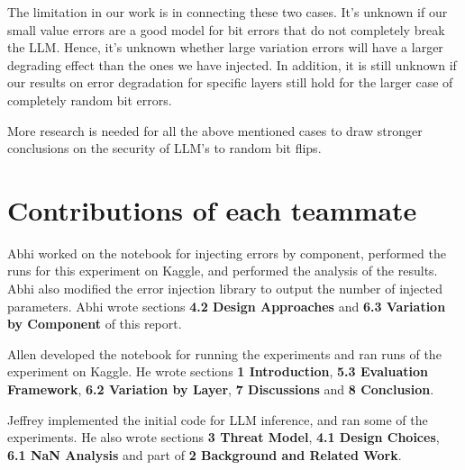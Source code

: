 The limitation in our work is in connecting these two cases. It's unknown if our small value errors are a good model for bit errors that do not completely break the LLM. Hence, it's unknown whether
large variation errors will have a larger degrading effect than the ones we have injected. In addition, it is still unknown if our results on error degradation for specific layers still hold for
the larger case of completely random bit errors.

More research is needed for all the above mentioned cases to draw stronger conclusions on the security of LLM's to random bit flips.

\section{Contributions of each teammate}
Abhi worked on the notebook for injecting errors by component, performed the runs for this experiment on Kaggle, and performed the analysis of the results. Abhi also modified the error injection library to output the number of injected parameters. Abhi wrote sections \textbf{4.2 Design Approaches} and \textbf{6.3 Variation by Component} of this report.

Allen developed the notebook for running the experiments and ran runs of the experiment on Kaggle. He wrote sections \textbf{1 Introduction}, \textbf{5.3 Evaluation Framework}, \textbf{6.2 Variation by Layer}, \textbf{7 Discussions} and \textbf{8 Conclusion}.

Jeffrey implemented the initial code for LLM inference, and ran some of the experiments. He also wrote sections \textbf{3 Threat Model}, \textbf{4.1 Design Choices}, \textbf{6.1 NaN Analysis} and part of \textbf{2 Background and Related Work}.


